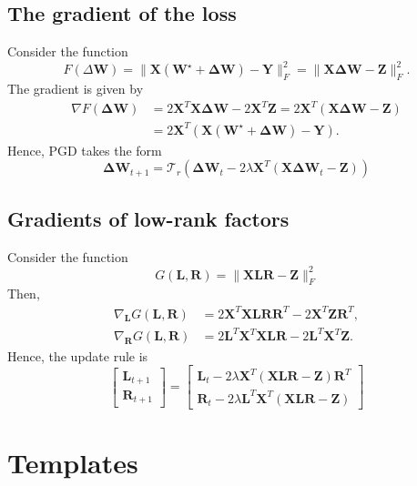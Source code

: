 \documentclass[11pt]{article}
\newcommand{\mat}[1]{\bm{#1}}
\newcommand{\DW}{\mat{\Delta W}}
\begin{document}
\subsection{The gradient of the loss}
Consider the function
\begin{equation*}
    F(\Delta \bm{W}) = \|\bm{X}(\bm{W}^{\star} + \DW) - \bm{Y}\|_F^2 = \|\bm{X}\DW - \bm{Z}\|_F^2.
\end{equation*}
The gradient is given by
\begin{align*}
    \nabla F(\DW) &= 2 \bm{X}^T \bm{X} \DW - 2\bm{X}^T \bm{Z} = 2\bm{X}^T(\bm{X} \DW - \bm{Z})\\
    & = 2\bm{X}^T(\bm{X}(\bm{W}^{\star} + \DW) - \bm{Y}).
\end{align*}
Hence, PGD takes the form
\begin{equation*}
    \DW_{t+1} = \mathcal{T}_r(\DW_t - 2\lambda \bm{X}^T(\bm{X} \DW_t - \bm{Z}))
\end{equation*}
\subsection{Gradients of low-rank factors}
Consider the function
\begin{equation*}
    G(\bm{L},\bm{R}) = \|\bm{X} \bm{L} \bm{R} - \bm{Z}\|_F^2
\end{equation*}
Then,
\begin{align*}
    \nabla_{\bm{L}} G(\bm{L},\bm{R}) &= 2 \bm{X}^T \bm{X} \bm{L} \bm{R} \bm{R}^T - 2 \bm{X}^T \bm{Z} \bm{R}^T,\\
    \nabla_{\bm{R}} G(\bm{L},\bm{R}) &= 2 \bm{L}^T \bm{X}^T \bm{X} \bm{L} \bm{R} - 2 \bm{L}^T \bm{X}^T \bm{Z}.
\end{align*}
Hence, the update rule is
\begin{equation*}
    \begin{bmatrix} \bm{L}_{t+1} \\ \bm{R}_{t+1} \end{bmatrix} = \begin{bmatrix}\bm{L}_{t} - 2\lambda \bm{X}^T (\bm{X} \bm{L} \bm{R} - \bm{Z})\bm{R}^T \\ 
    \bm{R}_{t} - 2 \lambda \bm{L}^T \bm{X}^T (\bm{X} \bm{L} \bm{R} - \bm{Z})\end{bmatrix}
\end{equation*}



\section{Templates}
\end{document}
